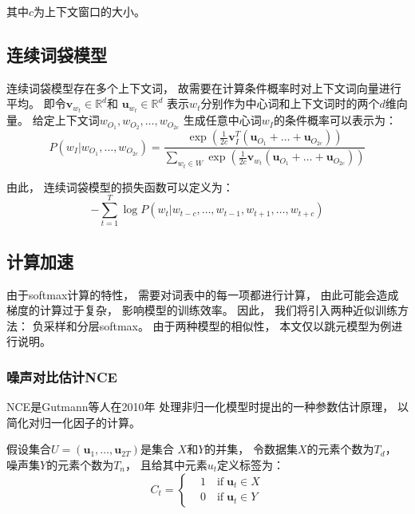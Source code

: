 其中$c$为上下文窗口的大小。

\subsection{连续词袋模型}

连续词袋模型存在多个上下文词，
故需要在计算条件概率时对上下文词向量进行平均。
即令$\mathbf{v}_{w_t}\in\mathbb{R}^d$和
$\mathbf{u}_{w_t}\in\mathbb{R}^d$
表示$w_t$分别作为中心词和上下文词时的两个$d$维向量。
给定上下文词$w_{O_1}, w_{O_2}, \ldots, w_{O_{2c}}$
生成任意中心词$w_I$的条件概率可以表示为：
\begin{equation}
    P\left(w_I|w_{O_1}, \ldots, w_{O_{2c}}\right) = \frac{\exp\left(\frac{1}{2c}\mathbf{v}_I^T\left(\mathbf{u}_{O_1}+\ldots+\mathbf{u}_{O_{2c}}\right)\right)}{\sum_{w_t\in W}\exp\left(\frac{1}{2c}\mathbf{v}_{w_t}\left(\mathbf{u}_{O_1}+\ldots+\mathbf{u}_{O_{2c}}\right)\right)}
\end{equation}

由此，
连续词袋模型的损失函数可以定义为：
\begin{equation}
    -\sum_{t=1}^T\log P\left(w_t|w_{t-c}, \ldots, w_{t-1}, w_{t+1}, \ldots, w_{t+c}\right)
\end{equation}

\subsection{计算加速}

由于softmax计算的特性，
需要对词表中的每一项都进行计算，
由此可能会造成梯度的计算过于复杂，
影响模型的训练效率。
因此，
我们将引入两种近似训练方法：
负采样和分层softmax。
由于两种模型的相似性，
本文仅以跳元模型为例进行说明。

\subsubsection{噪声对比估计NCE}

NCE是Gutmann等人在2010年\cite{gutmannNoisecontrastiveEstimationNew2010}
处理非归一化模型时提出的一种参数估计原理，
以简化对归一化因子的计算。

假设集合$U=\left(\mathbf{u}_1, \ldots, \mathbf{u}_{2T}\right)$是集合
$X$和$Y$的并集，
令数据集$X$的元素个数为$T_d$，
噪声集$Y$的元素个数为$T_n$，
且给其中元素$u_t$定义标签为：
\begin{equation}
    C_t = \left\{
    \begin{aligned}
         & 1 \quad \text{if} \; \mathbf{u}_t \in X \\
         & 0 \quad \text{if} \; \mathbf{u}_t \in Y
    \end{aligned}
    \right.
\end{equation}

